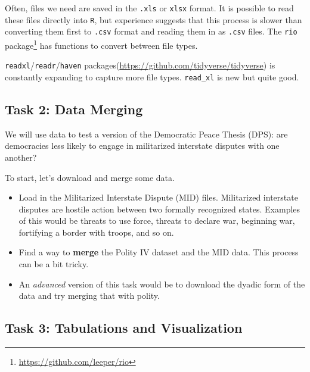 \documentclass[]{book}
\providecommand{\tightlist}{%
  \setlength{\itemsep}{0pt}\setlength{\parskip}{0pt}}
\let\rmarkdownfootnote\footnote%
\def\footnote{\protect\rmarkdownfootnote}
\theoremstyle{definition}
\theoremstyle{definition}
\theoremstyle{definition}
\theoremstyle{remark}
\begin{document}
Often, files we need are saved in the \texttt{.xls} or \texttt{xlsx}
format. It is possible to read these files directly into \texttt{R}, but
experience suggests that this process is slower than converting them
first to \texttt{.csv} format and reading them in as \texttt{.csv}
files. The \texttt{rio} package\footnote{\url{https://github.com/leeper/rio}}
has functions to convert between file types.

\texttt{readxl}/\texttt{readr}/\texttt{haven}
packages(\url{https://github.com/tidyverse/tidyverse}) is constantly
expanding to capture more file types. \texttt{read\_xl} is new but quite
good.

\subsection{Task 2: Data Merging}\label{task-2-data-merging}

We will use data to test a version of the Democratic Peace Thesis (DPS):
are democracies less likely to engage in militarized interstate disputes
with one another?

To start, let's download and merge some data.

\begin{itemize}
\tightlist
\item
  Load in the Militarized Interstate Dispute (MID) files. Militarized
  interstate disputes are hostile action between two formally recognized
  states. Examples of this would be threats to use force, threats to
  declare war, beginning war, fortifying a border with troops, and so
  on.
\item
  Find a way to \textbf{merge} the Polity IV dataset and the MID data.
  This process can be a bit tricky.
\item
  An \emph{advanced} version of this task would be to download the
  dyadic form of the data and try merging that with polity.
\end{itemize}

\subsection{Task 3: Tabulations and
Visualization}\label{task-3-tabulations-and-visualization}
\end{document}
